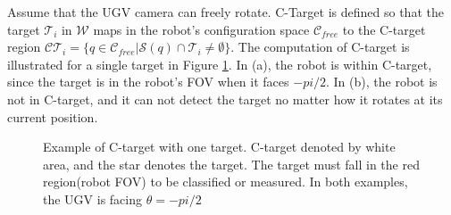 \documentclass[12pt,draftcls,onecolumn]{IEEEtran}
\begin{document}
Assume that the UGV camera can freely rotate.
C-Target is defined so that the target $\mathcal{T}_i$ in $\mathcal{W}$ maps  in the robot's configuration space  $\mathcal{C}_{free}$ to the C-target region  $\mathcal{CT}_i = \{q \in \mathcal{C}_{free}    |    \mathcal{S}(q) \cap \mathcal{T}_i  \neq  \emptyset \}$.
The computation of C-target is illustrated for a single target in Figure \ref{fig:4}.
In (a), the robot is within C-target, since the target is in the robot's FOV when it faces $-pi/2$.
In (b), the robot is not in C-target, and it can not detect the target no matter how it rotates at its current position. 



\begin{figure}[htp]
  \centering
  \quad
  \caption{Example of C-target with one target. C-target denoted by white area, and the star denotes the target. The target must fall in the red region(robot FOV) to be classified or measured. In both examples, the UGV is facing $\theta = -pi/2$}
  \label{fig:4}
\end{figure}
\end{document}
